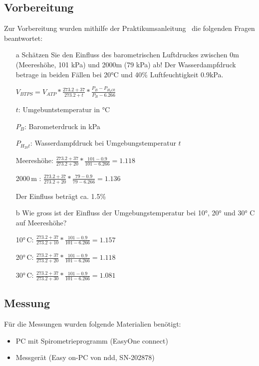 \documentclass[11pt]{scrartcl}
\begin{document}
    \subsection{Vorbereitung}

    Zur Vorbereitung wurden mithilfe der Praktikumsanleitung~\parencite{Spirometrie} die folgenden Fragen beantwortet: %

    \begin{itemize}
        \item[a] Schätzen Sie den Einfluss des barometrischen Luftdruckes zwischen 0m (Meereshöhe, 101 kPa) und 2000m (79 kPa) ab!
                 Der Wasserdampfdruck betrage in beiden Fällen bei 20°C und 40\% Luftfeuchtigkeit 0.9kPa.
        \item[]  $V_{BTPS}=V_{ATP}*\frac{273.2+37}{273.2+t}*\frac{P_B-P_{H_2Ot}}{P_B-6.266}$
        \item[] $t$: Umgebuntstemperatur in °C
        \item[] $P_B$: Barometerdruck in kPa
        \item[] $P_{H_20t}$: Wasserdampfdruck bei Umgebungstemperatur $t$
        \item[] Meereshöhe: $\frac{273.2+37}{273.2+20}*\frac{101-0.9}{101-6.266}=1.118$
        \item[] 2000\,m : $\frac{273.2+37}{273.2+20}*\frac{79-0.9}{79-6.266}=1.136$
        \item[] Der Einfluss beträgt ca. 1.5\%
        \item[b] Wie gross ist der Einfluss der Umgebungstemperatur bei 10°, 20° und 30° C auf Meereshöhe?
        \item[] 10°\,C: $\frac{273.2+37}{273.2+10}*\frac{101-0.9}{101-6.266}=1.157$
        \item[] 20°\,C: $\frac{273.2+37}{273.2+20}*\frac{101-0.9}{101-6.266}=1.118$
        \item[] 30°\,C: $\frac{273.2+37}{273.2+30}*\frac{101-0.9}{101-6.266}=1.081$

    \end{itemize}

    \subsection{Messung}

    Für die Messungen wurden folgende Materialien benötigt:

    \begin{itemize}
        \item PC mit Spirometrieprogramm (EasyOne connect)
        \item Messgerät (Easy on-PC von ndd, SN-202878)
    \end{itemize}
\end{document}
